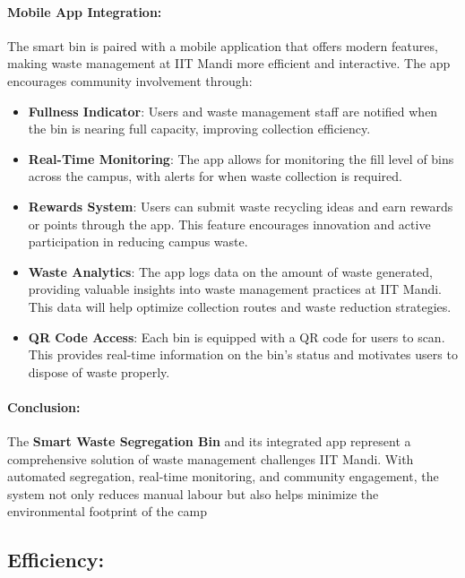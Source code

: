 \documentclass[
]{article}
\begin{document}
\hypertarget{mobile-app-integration}{%
\paragraph{\texorpdfstring{\textbf{Mobile App
Integration:}}{Mobile App Integration:}}\label{mobile-app-integration}}

The smart bin is paired with a mobile application that offers modern
features, making waste management at IIT Mandi more efficient and
interactive. The app encourages community involvement through:

\begin{itemize}
\item
  \textbf{Fullness Indicator}: Users and waste management staff are
  notified when the bin is nearing full capacity, improving collection
  efficiency.
\item
  \textbf{Real-Time Monitoring}: The app allows for monitoring the fill
  level of bins across the campus, with alerts for when waste collection
  is required.
\item
  \textbf{Rewards System}: Users can submit waste recycling ideas and
  earn rewards or points through the app. This feature encourages
  innovation and active participation in reducing campus waste.
\item
  \textbf{Waste Analytics}: The app logs data on the amount of waste
  generated, providing valuable insights into waste management practices
  at IIT Mandi. This data will help optimize collection routes and waste
  reduction strategies.
\item
  \textbf{QR Code Access}: Each bin is equipped with a QR code for users
  to scan. This provides real-time information on the bin's status and
  motivates users to dispose of waste properly.
\end{itemize}

\hypertarget{conclusion}{%
\paragraph{\texorpdfstring{\textbf{Conclusion:}}{Conclusion:}}\label{conclusion}}

The \textbf{Smart Waste Segregation Bin} and its integrated app
represent a comprehensive solution of waste management challenges IIT
Mandi. With automated segregation, real-time monitoring, and community
engagement, the system not only reduces manual labour but also helps
minimize the environmental footprint of the camp

\hypertarget{efficiency}{%
\subsection{Efficiency:}\label{efficiency}}
\end{document}
